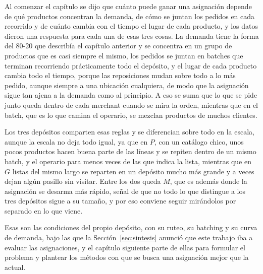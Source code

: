 Al comenzar el capítulo se dijo que cuánto puede ganar una asignación depende de qué productos concentran la demanda, de cómo se juntan los pedidos en cada recorrido y de cuánto cambia con el tiempo el lugar de cada producto, y los datos dieron una respuesta para cada una de esas tres cosas.
La demanda tiene la forma del 80-20 que describía el capítulo anterior y se concentra en un grupo de productos que es casi siempre el mismo, los pedidos se juntan en batches que terminan recorriendo prácticamente todo el depósito, y el lugar de cada producto cambia todo el tiempo, porque las reposiciones mudan sobre todo a lo más pedido, aunque siempre a una ubicación cualquiera, de modo que la asignación sigue tan ajena a la demanda como al principio.
A eso se suma que lo que se pide junto queda dentro de cada merchant cuando se mira la orden, mientras que en el batch, que es lo que camina el operario, se mezclan productos de muchos clientes.

Los tres depósitos comparten esas reglas y se diferencian sobre todo en la escala, aunque la escala no deja todo igual, ya que en $P$, con un catálogo chico, unos pocos productos hacen buena parte de las líneas y se repiten dentro de un mismo batch, y el operario para menos veces de las que indica la lista, mientras que en $G$ listas del mismo largo se reparten en un depósito mucho más grande y a veces dejan algún pasillo sin visitar.
Entre los dos queda $M$, que es además donde la asignación se desarma más rápido, señal de que no todo lo que distingue a los tres depósitos sigue a su tamaño, y por eso conviene seguir mirándolos por separado en lo que viene.

Esas son las condiciones del propio depósito, con su ruteo, su batching y su curva de demanda, bajo las que la Sección~\ref{sec:sintesis} anunció que este trabajo iba a evaluar las asignaciones, y el capítulo siguiente parte de ellas para formular el problema y plantear los métodos con que se busca una asignación mejor que la actual.
